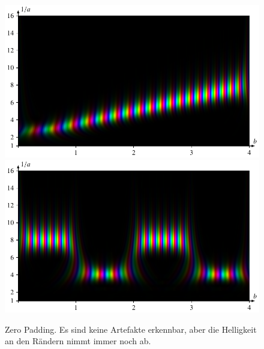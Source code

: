 \begin{figure}
	\centering
	\includegraphics[width=\linewidth, keepaspectratio]{papers/complex/images/padding_zero_sweep.pdf}
	\includegraphics[width=\linewidth, keepaspectratio]{papers/complex/images/padding_zero_square.pdf}
	\caption{Zero Padding. Es sind keine Artefakte erkennbar, aber die Helligkeit an den Rändern nimmt immer noch ab.}
	\label{complex:padding-zero}
\end{figure}

